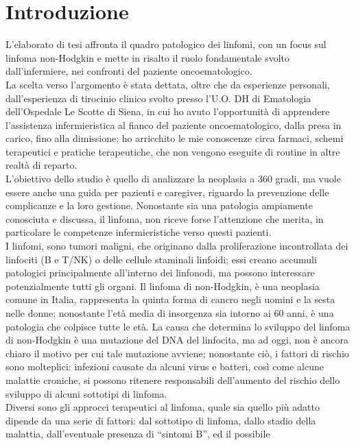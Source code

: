 \section*{Introduzione}
   
L'elaborato di tesi affronta il quadro patologico dei linfomi, con un focus sul linfoma non-Hodgkin 
e mette in risalto il ruolo fondamentale svolto dall'infermiere, nei confronti del paziente oncoematologico.\\
La scelta verso l'argomento è stata dettata, oltre che da esperienze personali, dall'esperienza di tirocinio clinico 
svolto presso l'U.O. DH di Ematologia dell'Ospedale Le Scotte di Siena, in cui ho avuto l'opportunità di apprendere 
l'assistenza infermieristica al fianco del paziente oncoematologico, dalla presa in carico, fino alla dimissione;
ho arricchito le mie conoscenze circa farmaci, schemi terapeutici e pratiche terapeutiche, 
che non vengono eseguite di routine in altre realtà di reparto.\\ 
L'obiettivo dello studio è quello di analizzare la neoplasia a 360 gradi, ma vuole essere anche 
una guida per pazienti e caregiver, riguardo la prevenzione delle 
complicanze e la loro gestione. Nonostante sia una patologia ampiamente conosciuta e discussa, il linfoma,
non riceve forse l'attenzione che merita, in particolare le competenze infermieristiche verso questi pazienti.\\
I linfomi, sono tumori maligni, che originano dalla proliferazione incontrollata dei linfociti (B e T/NK) o delle 
cellule staminali linfoidi; essi creano accumuli patologici principalmente all’interno dei linfonodi, 
ma possono interessare potenzialmente tutti gli organi.
Il linfoma di non-Hodgkin, è una neoplasia comune in Italia, rappresenta la quinta forma di cancro negli uomini e la 
sesta nelle donne; nonostante l'età media di insorgenza sia intorno ai 60 anni, è una patologia che colpisce tutte 
le età. La causa che determina lo sviluppo del linfoma di non-Hodgkin è una mutazione del DNA del linfocita, ma ad 
oggi, non è ancora chiaro il motivo per cui tale mutazione avviene; nonostante ciò, i fattori di rischio sono 
molteplici:  infezioni causate da alcuni virus e batteri, così come alcune malattie croniche, si possono ritenere 
responsabili dell’aumento del rischio dello sviluppo di alcuni sottotipi di linfoma.\\
Diversi sono gli approcci terapeutici al linfoma, quale sia quello più adatto dipende da una serie di fattori:
dal sottotipo di linfoma, dallo stadio della malattia, dall’eventuale presenza di “sintomi B”, ed il possibile 
